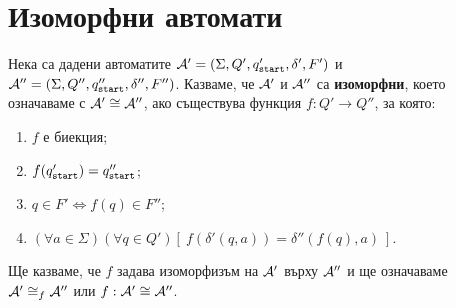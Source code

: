\section{Изоморфни автомати}
\label{sect:isomorphic}

Нека са дадени автоматите
$\mathcal{A}' = (\Sigma,Q',q_{\texttt{start}}',\delta',F')$ и $\mathcal{A}'' = (\Sigma, Q'', q_{\texttt{start}}'', \delta'', F'')$.
Казваме, че $\mathcal{A}'$ и $\mathcal{A}''$ са {\bf изоморфни}, което означаваме с $\mathcal{A}' \cong \mathcal{A}''$, ако
съществува функция $f: Q'\to Q''$, за която:
\begin{enumerate}[(1)]
\item
  $f$ е биекция;
\item
  $f(q_{\texttt{start}}') = q_{\texttt{start}}''$;
\item
  $q \in F' \iff f(q) \in F''$;
\item
  $(\forall a\in\Sigma)(\forall q\in Q')[\ f(\delta'(q,a)) = \delta''(f(q),a)\ ]$.
\end{enumerate}
Ще казваме, че $f$ задава изоморфизъм на $\mathcal{A}'$ върху $\mathcal{A}''$ и ще означаваме $\mathcal{A}' \cong_f \mathcal{A}''$ или $f:\mathcal{A}' \cong \mathcal{A}''$.

